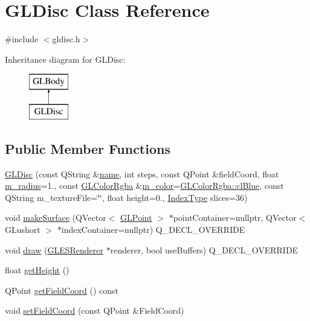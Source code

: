 \hypertarget{class_g_l_disc}{}\section{G\+L\+Disc Class Reference}
\label{class_g_l_disc}


{\ttfamily \#include $<$gldisc.\+h$>$}

Inheritance diagram for G\+L\+Disc\+:\begin{figure}[H]
\begin{center}
\leavevmode
\includegraphics[height=2.000000cm]{class_g_l_disc}
\end{center}
\end{figure}
\subsection*{Public Member Functions}
\begin{DoxyCompactItemize}
\item 
\mbox{\hyperlink{class_g_l_disc_a0964e31d88f1b4915b536b9943e0e2f8}{G\+L\+Disc}} (const Q\+String \&\mbox{\hyperlink{class_g_l_body_af9f19479127cf12562fa0a2f9b5276f4}{name}}, int steps, const Q\+Point \&field\+Coord, float \mbox{\hyperlink{class_g_l_body_a96006c2b453ffe0490bee1961e61e3b3}{m\+\_\+radius}}=1., const \mbox{\hyperlink{class_g_l_color_rgba}{G\+L\+Color\+Rgba}} \&\mbox{\hyperlink{class_g_l_body_a267b5c0fbe5752370197012975663dca}{m\+\_\+color}}=\mbox{\hyperlink{class_g_l_color_rgba_abf246bb4f542851d17ba84b5143a9214}{G\+L\+Color\+Rgba\+::cl\+Blue}}, const Q\+String m\+\_\+texture\+File=\char`\"{}\char`\"{}, float height=0., \mbox{\hyperlink{gldefines_8h_af3c748960f29c42e5b7f1dc449ab66ff}{Index\+Type}} slices=36)
\item 
void \mbox{\hyperlink{class_g_l_disc_a5b74533be5d65c44f7f5493163b94eb4}{make\+Surface}} (Q\+Vector$<$ \mbox{\hyperlink{class_g_l_point}{G\+L\+Point}} $>$ $\ast$point\+Container=nullptr, Q\+Vector$<$ G\+Lushort $>$ $\ast$index\+Container=nullptr) Q\+\_\+\+D\+E\+C\+L\+\_\+\+O\+V\+E\+R\+R\+I\+DE
\item 
void \mbox{\hyperlink{class_g_l_disc_a7fca90525cba1fb6099d70730375cc6e}{draw}} (\mbox{\hyperlink{class_g_l_e_s_renderer}{G\+L\+E\+S\+Renderer}} $\ast$renderer, bool use\+Buffers) Q\+\_\+\+D\+E\+C\+L\+\_\+\+O\+V\+E\+R\+R\+I\+DE
\item 
float \mbox{\hyperlink{class_g_l_disc_a4cc6514312b042f1af87a5ce92bf1f71}{get\+Height}} ()
\item 
Q\+Point \mbox{\hyperlink{class_g_l_disc_aa26416ba9591aa2d86b30b663e67a1a8}{get\+Field\+Coord}} () const
\item 
void \mbox{\hyperlink{class_g_l_disc_a5f73b9821e996ecdc909a743b79925dd}{set\+Field\+Coord}} (const Q\+Point \&Field\+Coord)
\end{DoxyCompactItemize}
